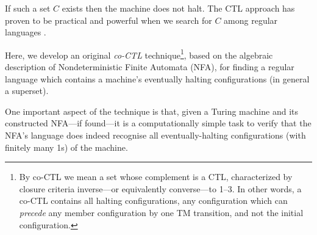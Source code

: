If such a set $C$ exists then the machine does not halt.
The CTL approach has proven to be practical and powerful when we search for $C$ among regular languages \cite{ShawnCTL} \cite{BruteforceCTL}.

Here, we develop an original \textit{co-CTL} technique\footnote{By co-CTL we mean a set whose complement is a CTL, characterized by closure criteria inverse---or equivalently converse---to 1--3. In other words, a co-CTL contains all halting configurations, any configuration which can \emph{precede} any member configuration by one TM transition, and not the initial configuration.}, based on the algebraic description of Nondeterministic Finite Automata (NFA), for finding a regular language which contains a machine's eventually halting configurations (in general a superset).

One important aspect of the technique is that, given a Turing machine and its constructed NFA---if found---it is a computationally simple task to verify that the NFA's language does indeed recognise all eventually-halting configurations (with finitely many 1s) of the machine.


\usetikzlibrary {automata, positioning}

